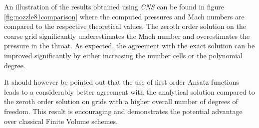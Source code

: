 An illustration of the results obtained using \emph{CNS} can be found in figure
\ref{fig:nozzle81comparison} where the computed pressures and Mach numbers
are compared to the respective theoretical values. The zeroth order solution on
the coarse grid significantly underestimates the Mach number and overestimates
the pressure in the throat. As expected, the agreement with the exact solution
can be improved significantly by either increasing the number cells or the
polynomial degree.

It should however be pointed out that the use of first order Ansatz functions
leads to a considerably better agreement with the analytical solution compared
to the zeroth order solution on grids with a higher overall number of degrees
of freedom. This result is encouraging and demonstrates the potential advantage
over classical Finite Volume schemes.
